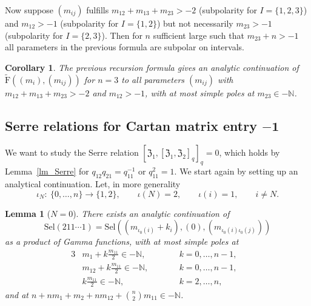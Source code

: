 \documentclass[pdftex]{sigma}%
\numberwithin{equation}{section}
\newtheorem{cor}[teo]{Corollary}
\newtheorem{lem}[teo]{Lemma}
\newcommand{\N}{\mathbb{N}}
\newcommand{\zem}{\mathfrak{Z}}
\newcommand{\Sel}{\mathrm{Sel}}
\newcommand{\rFp}{\tilde{\mathrm{F}}}
\begin{document}
Now suppose $(m_{ij})$ fulfills $m_{12}+m_{13}+m_{23}>-2$ (subpolarity for $I=\{1,2,3\}$) and $m_{12}>-1$ (subpolarity for $I=\{1,2\}$) but not necessarily $m_{23}>-1$ (subpolarity for $I=\{2,3\}$). Then for $n$ sufficient large such that $m_{23}+n>-1$ all parameters in the previous formula are subpolar on intervals.

\begin{cor}\label{cor_RecursionContinuation3} The previous recursion formula gives an analytic continuation of $\rFp((m_i){,}(m_{ij}))$ for $n=3$ to all parameters $(m_{ij})$ with $m_{12}+m_{13}+m_{23}>-2$ and $m_{12}>-1$, with at most simple poles at $m_{23}\in-\N$.
\end{cor}

\subsection[Serre relations for Cartan matrix entry $-1$]{Serre relations for Cartan matrix entry $\boldsymbol{-1}$}\label{sec_Serre}

We want to study the Serre relation $[\zem_1,[\zem_1,\zem_2]_q]_q=0$, which holds by Lemma~\ref{lm_Serre} for $q_{12}q_{21}=q_{11}^{-1}$ or $q_{11}^2=1$. We start again by setting up an analytical continuation. Let, in more generality
\[\iota_N\colon \ \{0,\dots,n\}\to \{1,2\},\qquad
\iota(N)=2,\qquad \iota(i)=1, \qquad i\neq N.\]

\begin{lem}[$N=0$] There exists an analytic continuation of
\[\Sel(211\cdots 1)=\Sel((m_{\iota_0(i)}+k_i),(0), (m_{\iota_0(i)\iota_0(j)}))\]
as a product of Gamma functions, with at most simple poles at
	\begin{alignat*}{3}
		& m_1+ k \frac{m_{11}}{2}  \in -\N, \qquad && k=0,\dots,n-1,& \\
		& m_{12}+k\frac{m_{11}}{2}  \in -\N,  \qquad&&  k=0,\dots,n-1, & \\
		& k\frac{m_{11}}{2}  \in -\N,  \qquad && k=2,\dots,n, &
		\end{alignat*}
	and at $n+ nm_1+m_2 + nm_{12} + {n\choose 2} m_{11} \in -\N$.
\end{lem}
	
\end{document}
